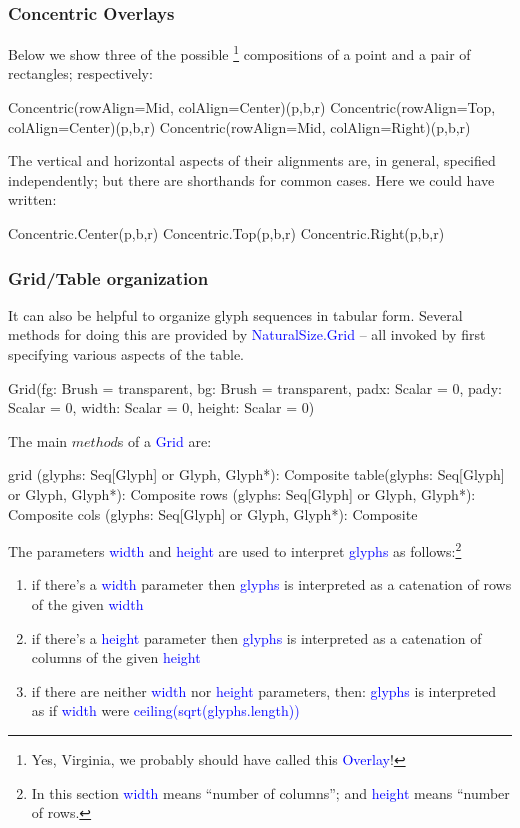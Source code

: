 \documentclass[12pt,a4paper]{article}
\def\Scala#1{\textcolor{blue}{\textsf{#1}}}
\def\SSS#1{\subsubsection*{#1}}
\begin{document}
\SSS{Concentric Overlays}
Below we show three of the possible \footnote{Yes,
Virginia, we probably should have called this \Scala{Overlay}!} 
compositions of a point and a pair of rectangles; respectively:
\begin{scala}
        Concentric(rowAlign=Mid, colAlign=Center)(p,b,r)
        Concentric(rowAlign=Top, colAlign=Center)(p,b,r)      
        Concentric(rowAlign=Mid, colAlign=Right)(p,b,r)
\end{scala}

\begin{center}
\quad\quad
{}
\quad\quad
{} 
\end{center}


The vertical and horizontal aspects of their alignments are, in general,
specified independently; but there are shorthands for common cases. Here
we could have written:

\begin{scala}
        Concentric.Center(p,b,r)
        Concentric.Top(p,b,r)
        Concentric.Right(p,b,r)      
\end{scala}

\clearpage
\SSS{Grid/Table organization}

It can also be helpful to organize glyph sequences in tabular form.
Several methods for doing this are provided by \Scala{NaturalSize.Grid}
-- all invoked by first specifying various aspects of the table.
\begin{scala}
        Grid(fg:     Brush  = transparent,
             bg:     Brush  = transparent,
             padx:   Scalar = 0,
             pady:   Scalar = 0,
             width:  Scalar = 0,
             height: Scalar = 0)
\end{scala}

The main $method$s of a \Scala{Grid} are:
\begin{scala}
  grid (glyphs: Seq[Glyph] or Glyph, Glyph*): Composite
  table(glyphs: Seq[Glyph] or Glyph, Glyph*): Composite
  rows (glyphs: Seq[Glyph] or Glyph, Glyph*): Composite
  cols (glyphs: Seq[Glyph] or Glyph, Glyph*): Composite
\end{scala}

The parameters \Scala{width} and \Scala{height}  are used to interpret
\Scala{glyphs} as follows:\footnote{In this section
\Scala{width} means ``number of columns''; and \Scala{height} means
``number of rows.}
\begin{enumerate}
     \item  if there's a \Scala{width} parameter then \Scala{glyphs} is interpreted as a catenation of rows of the given \Scala{width}
     \item  if there's a \Scala{height} parameter then \Scala{glyphs} is interpreted as a catenation of columns of the given \Scala{height}
     \item  if there are neither \Scala{width} nor \Scala{height} parameters, then:
            \Scala{glyphs} is interpreted as if \Scala{width} were \Scala{ceiling(sqrt(glyphs.length))}
\end{enumerate}
\end{document}
